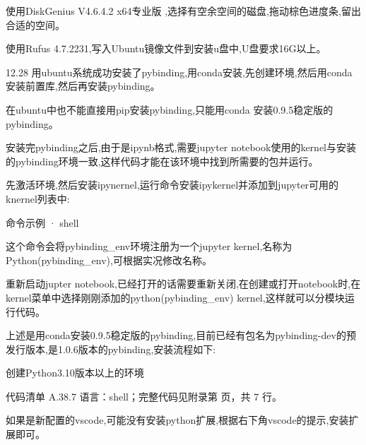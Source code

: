 \documentclass[lang=cn,scheme=chinese,color=blue,device=normal,toc=onecol,math=cm]{elegantbook}
\begin{document}
使用DiskGenius V4.6.4.2 x64专业版 ,选择有空余空间的磁盘,拖动棕色进度条,留出合适的空间。\par


使用Rufus 4.7.2231,写入Ubuntu镜像文件到安装u盘中,U盘要求16G以上。\par


12.28 用ubuntu系统成功安装了pybinding,用conda安装,先创建环境,然后用conda安装前置库,然后再安装pybinding。\par


在ubuntu中也不能直接用pip安装pybinding,只能用conda 安装0.9.5稳定版的pybinding。\par


安装完pybinding之后,由于是ipynb格式,需要jupyter notebook使用的kernel与安装的pybinding环境一致,这样代码才能在该环境中找到所需要的包并运行。\par


先激活环境,然后安装ipynernel,运行命令安装ipykernel并添加到jupyter可用的knernel列表中:\par


\begin{inlinecodebox}{命令示例 · shell}
\end{inlinecodebox}


这个命令会将pybinding\_\allowbreak{}env环境注册为一个jupyter kernel,名称为Python(pybinding\_\allowbreak{}env),可根据实况修改名称。\par


重新启动jupter notebook,已经打开的话需要重新关闭,在创建或打开notebook时,在kernel菜单中选择刚刚添加的python(pybinding\_\allowbreak{}env) kernel,这样就可以分模块运行代码。\par


上述是用conda安装0.9.5稳定版的pybinding,目前已经有包名为pybinding-dev的预发行版本,是1.0.6版本的pybinding,安装流程如下:\par


创建Python3.10版本以上的环境\par


\begin{codeindexbox}{代码清单 A.38.7}
语言：shell；完整代码见附录第 \pageref{code:38:7} 页，共 7 行。
\end{codeindexbox}


如果是新配置的vscode,可能没有安装python扩展,根据右下角vscode的提示,安装扩展即可。\par
\end{document}
